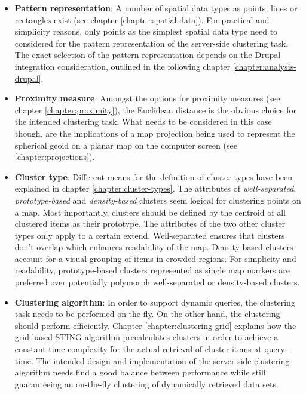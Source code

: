 \begin{itemize}

\item \textbf{Pattern representation}: A number of spatial data types as points, lines or rectangles exist (see chapter \ref{chapter:spatial-data}). For practical and simplicity reasons, only points as the simplest spatial data type need to considered for the pattern representation of the server-side clustering task. The exact selection of the pattern representation depends on the Drupal integration consideration, outlined in the following chapter \ref{chapter:analysis-drupal}.

\item \textbf{Proximity measure}: Amongst the options for proximity measures (see chapter \ref{chapter:proximity}), the Euclidean distance is the obvious choice for the intended clustering task. What needs to be considered in this case though, are the implications of a map projection being used to represent the spherical geoid on a planar map on the computer screen (see \ref{chapter:projections}).

\item \textbf{Cluster type}: Different means for the definition of cluster types have been explained in chapter \ref{chapter:cluster-types}. The attributes of \textit{well-separated}, \textit{prototype-based} and \textit{density-based} clusters seem logical for clustering points on a map. Most importantly, clusters should be defined by the centroid of all clustered items as their prototype. The attributes of the two other cluster types only apply to a certain extend. Well-separated ensures that clusters don't overlap which enhances readability of the map. Density-based clusters account for a visual grouping of items in crowded regions. For simplicity and readability, prototype-based clusters represented as single map markers are preferred over potentially polymorph well-separated or density-based clusters.

\item \textbf{Clustering algorithm}: In order to support dynamic queries, the clustering task needs to be performed on-the-fly. On the other hand, the clustering should perform efficiently. Chapter \ref{chapter:clustering-grid} explains how the grid-based STING algorithm precalculates clusters in order to achieve a constant time complexity for the actual retrieval of cluster items at query-time. The intended design and implementation of the server-side clustering algorithm needs find a good balance between performance while still guaranteeing an on-the-fly clustering of dynamically retrieved data sets.

\end{itemize}


